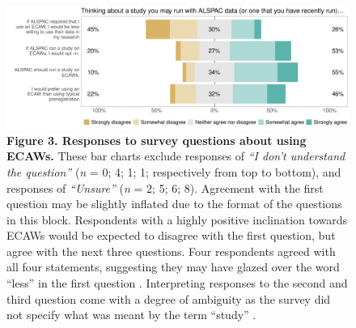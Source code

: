 \documentclass[
  man,floatsintext]{apa6}
\begin{document}
\begin{figure}[H]

{\centering \includegraphics[width=1\linewidth]{figs/alspacPlot-1} 

}

\caption{\textbf{Figure 3. Responses to survey questions about using ECAWs.} These bar charts exclude responses of \emph{``I don't understand the question''} (\emph{n} = 0; 4; 1; 1; respectively from top to bottom), and responses of \emph{``Unsure''} (\emph{n} = 2; 5; 6; 8). Agreement with the first question may be slightly inflated due to the format of the questions in this block. Respondents with a highly positive inclination towards ECAWs would be expected to disagree with the first question, but agree with the next three questions. Four respondents agreed with all four statements, suggesting they may have glazed over the word ``less'' in the first question \protect\footnotemark[3]. Interpreting responses to the second and third question come with a degree of ambiguity as the survey did not specify what was meant by the term ``study'' \protect\footnotemark[4].}\label{fig:alspacPlot}
\end{figure}

{\smaller[1] \singlespacing



}

\protect{}
\protect{}

\pagebreak
\end{document}
